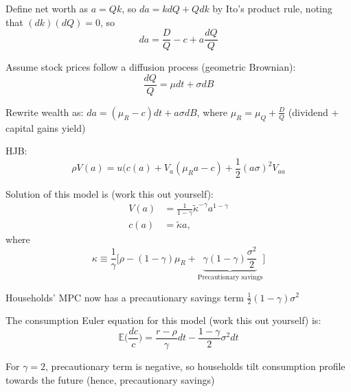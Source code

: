 \documentclass[11pt, aspectratio=169]{beamer}
\newenvironment{witemize}{\itemize\addtolength{\itemsep}{10pt}}{\enditemize}
\begin{document}
\begin{frame}{}
\begin{witemize}
\item Define net worth as $a = Qk$, so $da = k dQ + Q dk$ by Ito's product rule, noting that $(dk)(dQ) = 0$, so 
\begin{equation*}
	da = \frac{D}{Q} - c + a \frac{dQ}{Q}
\end{equation*}

\item Assume stock prices follow a diffusion process (geometric Brownian): 
\begin{equation*}
	\frac{dQ}{Q} = \mu dt + \sigma dB
\end{equation*}

\item Rewrite wealth as: $da = (\mu_R - c) dt + a \sigma dB$, where $\mu_R = \mu_Q + \frac{D}{Q}$ (dividend + capital gains yield)

\item HJB: 
\begin{equation*}
	\rho V(a) = u(c(a) + V_a (\mu_R a - c) + \frac{1}{2} (a \sigma)^2 V_{aa}
\end{equation*}
\end{witemize}
\end{frame}



\begin{frame}{}
\begin{witemize}
\item Solution of this model is (work this out yourself): 
\begin{align*}
	V(a) &= \frac{1}{1-\gamma} \tilde \kappa^{-\gamma} a^{1-\gamma} \\
	c(a) &= \tilde \kappa a,
\end{align*}
where 
\begin{equation*}
	\kappa \equiv \frac{1}{\gamma} \bigg[ \rho - (1-\gamma) \mu_R + \underbrace{ \gamma(1-\gamma) \frac{\sigma^2}{2}}_\text{Precautionary savings} \bigg] 
\end{equation*}

\item Households' MPC now has a precautionary savings term $\frac{1}{2}(1-\gamma) \sigma^2$

\item The consumption Euler equation for this model (work this out yourself) is:
\begin{equation*}
	\mathbb{E} \bigg( \frac{dc}{c} \bigg) = \frac{r - \rho}{\gamma} dt - \frac{1-\gamma}{2} \sigma^2 dt
\end{equation*}

\item For $\gamma = 2$, precautionary term is negative, so households tilt consumption profile towards the future (hence, precautionary savings)
\end{witemize}
\end{frame}
\end{document}

